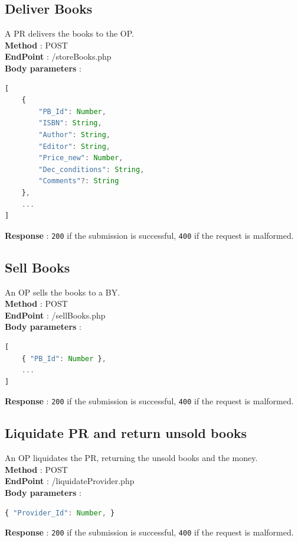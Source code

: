 \subsection{Deliver Books}
A PR delivers the books to the OP.\\
\textbf{Method} : POST \\
\textbf{EndPoint} : /storeBooks.php \\
\textbf{Body parameters} :
\begin{lstlisting}[language=JavaScript, label={lst:jscode}, basicstyle=\ttfamily]
[
    {
        "PB_Id": Number,
        "ISBN": String,
        "Author": String,
        "Editor": String,
        "Price_new": Number,
        "Dec_conditions": String,
        "Comments"?: String
    },
    ...
]
\end{lstlisting}
\textbf{Response} : \texttt{200} if the submission is successful, \texttt{400} if the request is malformed.

\subsection{Sell Books}
An OP sells the books to a BY.\\
\textbf{Method} : POST \\
\textbf{EndPoint} : /sellBooks.php \\
\textbf{Body parameters} :
\begin{lstlisting}[language=JavaScript, label={lst:jscode}, basicstyle=\ttfamily]
[
    { "PB_Id": Number },
    ...
]
\end{lstlisting}
\textbf{Response} : \texttt{200} if the submission is successful, \texttt{400} if the request is malformed.

\subsection{Liquidate PR and return unsold books}
An OP liquidates the PR, returning the unsold books and the money.\\
\textbf{Method} : POST \\
\textbf{EndPoint} : /liquidateProvider.php \\
\textbf{Body parameters} :
\begin{lstlisting}[language=JavaScript, label={lst:jscode}, basicstyle=\ttfamily]
{ "Provider_Id": Number, }
\end{lstlisting}
\textbf{Response} : \texttt{200} if the submission is successful, \texttt{400} if the request is malformed.

